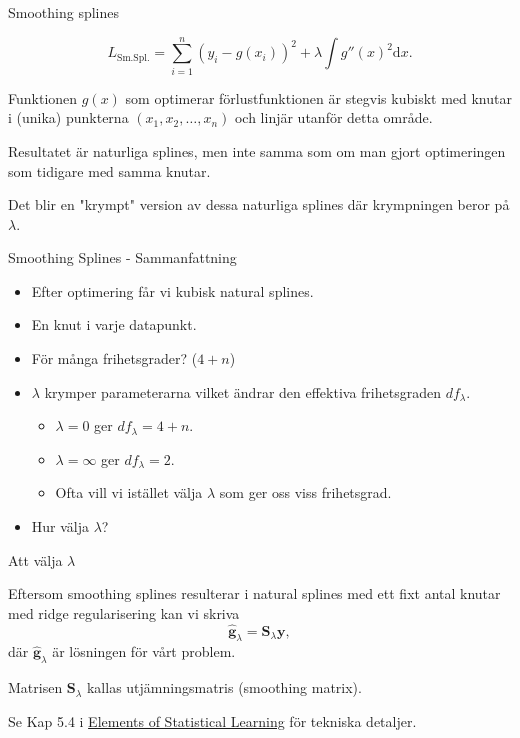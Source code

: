 \documentclass[10pt,english]{beamer}
\begin{document}
\begin{frame}{Smoothing splines}

    \begin{equation*}
        L_{\text{Sm.Spl.}} = \sum_{i=1}^{n}(y_i - g(x_i))^2 + \lambda \int g''(x)^2 \mathrm{d}x.
    \end{equation*}

    \begin{bluebox}
        Funktionen $g(x)$ som optimerar förlustfunktionen är stegvis kubiskt med knutar i (unika) punkterna $(x_1, x_2, \ldots, x_n)$ och linjär utanför detta område.
    \end{bluebox}

    Resultatet är naturliga splines, men inte samma som om man gjort optimeringen som tidigare med samma knutar.

    Det blir en "krympt" version av dessa naturliga splines där krympningen beror på $\lambda$.
    
\end{frame}

\begin{frame}{Smoothing Splines - Sammanfattning}

    \begin{itemize}
        \item Efter optimering får vi kubisk natural splines.
        \item En knut i varje datapunkt.
        \item För många frihetsgrader? ($4+n$)
        \item $\lambda$ krymper parameterarna vilket ändrar den effektiva frihetsgraden $df_{\lambda}$.
        \begin{itemize}
            \item $\lambda = 0$ ger $df_{\lambda} = 4+n$.
            \item $\lambda = \infty$ ger $df_{\lambda} = 2$.
            \item Ofta vill vi istället välja $\lambda$ som ger oss viss frihetsgrad.
        \end{itemize}
        \item Hur välja $\lambda$?
    \end{itemize}
    
\end{frame}

\begin{frame}{Att välja $\lambda$}
    
    Eftersom smoothing splines resulterar i natural splines med ett fixt antal knutar med ridge regularisering kan vi skriva
    \begin{equation*}
        \hat{\mathbf{g}}_{\lambda} = \mathbf{S}_{\lambda} \mathbf{y},
    \end{equation*}
    där $\hat{\mathbf{g}}_{\lambda}$ är lösningen för vårt problem.

    Matrisen $\mathbf{S}_{\lambda}$ kallas utjämningsmatris (smoothing matrix).

    Se Kap 5.4 i \href{https://hastie.su.domains/ElemStatLearn/}{Elements of Statistical Learning} för tekniska detaljer.

\end{frame}
\end{document}
